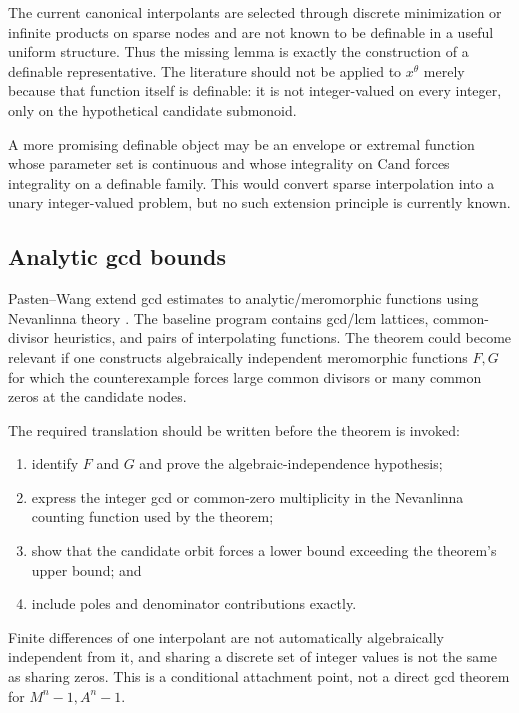 \documentclass[10pt,letterpaper]{article}
\newcommand{\Cand}{\mathrm{Cand}}
\begin{document}
The current canonical interpolants are selected through discrete minimization or infinite
products on sparse nodes and are not known to be definable in a useful uniform structure.
Thus the missing lemma is exactly the construction of a definable representative.  The
literature should not be applied to \(x^\theta\) merely because that function itself is
definable: it is not integer-valued on every integer, only on the hypothetical candidate
submonoid.

A more promising definable object may be an envelope or extremal function whose parameter
set is continuous and whose integrality on \(\Cand\) forces integrality on a definable family.
This would convert sparse interpolation into a unary integer-valued problem, but no such
extension principle is currently known.

\subsection{Analytic gcd bounds}

Pasten--Wang extend gcd estimates to analytic/meromorphic functions using Nevanlinna theory
\cite{PastenWang}.  The baseline program contains gcd/lcm lattices, common-divisor heuristics,
and pairs of interpolating functions.  The theorem could become relevant if one constructs
algebraically independent meromorphic functions \(F,G\) for which the counterexample forces
large common divisors or many common zeros at the candidate nodes.

The required translation should be written before the theorem is invoked:

\begin{enumerate}
\item identify \(F\) and \(G\) and prove the algebraic-independence hypothesis;
\item express the integer gcd or common-zero multiplicity in the Nevanlinna counting
function used by the theorem;
\item show that the candidate orbit forces a lower bound exceeding the theorem's upper bound;
and
\item include poles and denominator contributions exactly.
\end{enumerate}

Finite differences of one interpolant are not automatically algebraically independent from
it, and sharing a discrete set of integer values is not the same as sharing zeros.  This is a
conditional attachment point, not a direct gcd theorem for \(M^n-1,A^n-1\).
\end{document}
